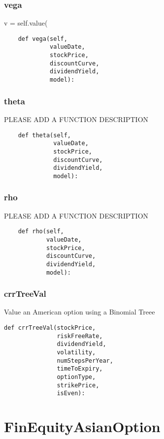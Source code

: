 \documentclass[twoside,11pt]{book}
\begin{document}
\subsubsection*{{\bf vega}}
v = self.value( 

\begin{lstlisting}
    def vega(self,
             valueDate,
             stockPrice,
             discountCurve,
             dividendYield,
             model):
\end{lstlisting}

\subsubsection*{{\bf theta}}
PLEASE ADD A FUNCTION DESCRIPTION

\begin{lstlisting}
    def theta(self,
              valueDate,
              stockPrice,
              discountCurve,
              dividendYield,
              model):
\end{lstlisting}

\subsubsection*{{\bf rho}}
PLEASE ADD A FUNCTION DESCRIPTION

\begin{lstlisting}
    def rho(self,
            valueDate,
            stockPrice,
            discountCurve,
            dividendYield,
            model):
\end{lstlisting}

\subsubsection*{{\bf crrTreeVal}}
Value an American option using a Binomial Treee  

\begin{lstlisting}
def crrTreeVal(stockPrice,
               riskFreeRate,
               dividendYield,
               volatility,
               numStepsPerYear,
               timeToExpiry,
               optionType,
               strikePrice,
               isEven):
\end{lstlisting}

\newpage
\section{FinEquityAsianOption}
\end{document}
